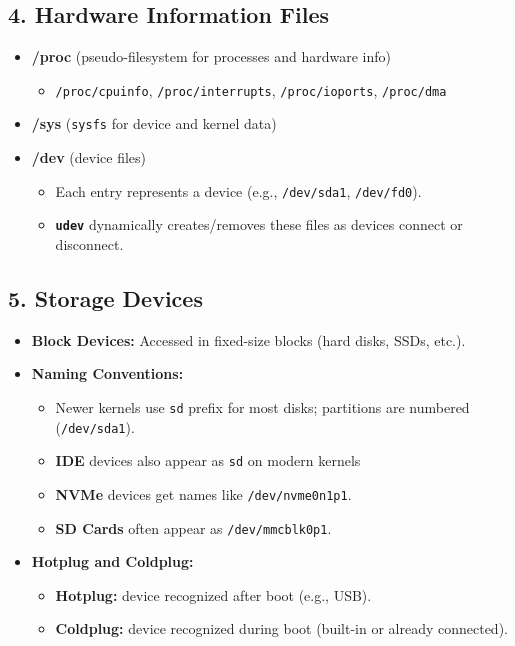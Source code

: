 \documentclass[a4paper]{report}
\begin{document}
\subsection*{4. Hardware Information Files}
\begin{itemize}
    \item \textbf{/proc} (pseudo-filesystem for processes and hardware info)
    \begin{itemize}
        \item \texttt{/proc/cpuinfo}, \texttt{/proc/interrupts}, \texttt{/proc/ioports}, \texttt{/proc/dma}
    \end{itemize}
    \item \textbf{/sys} (\texttt{sysfs} for device and kernel data)
    \item \textbf{/dev} (device files)
    \begin{itemize}
        \item Each entry represents a device (e.g., \texttt{/dev/sda1}, \texttt{/dev/fd0}).
        \item \textbf{\texttt{udev}} dynamically creates/removes these files as devices connect or disconnect.
    \end{itemize}
\end{itemize}

\subsection*{5. Storage Devices}
\begin{itemize}
    \item \textbf{Block Devices:} Accessed in fixed-size blocks (hard disks, SSDs, etc.).
    \item \textbf{Naming Conventions:}
    \begin{itemize}
        \item Newer kernels use \texttt{sd} prefix for most disks; partitions are numbered (\texttt{/dev/sda1}).
        \item \textbf{IDE} devices also appear as \texttt{sd} on modern kernels
        \item \textbf{NVMe} devices get names like \texttt{/dev/nvme0n1p1}.
        \item \textbf{SD Cards} often appear as \texttt{/dev/mmcblk0p1}.
    \end{itemize}

    \item \textbf{Hotplug and Coldplug:}
    \begin{itemize}
        \item \textbf{Hotplug:} device recognized after boot (e.g., USB).
        \item \textbf{Coldplug:} device recognized during boot (built-in or already connected).
    \end{itemize}
\end{itemize}
\end{document}
